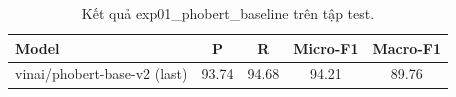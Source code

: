 \begin{table}[t]
\centering
\begin{tabular}{lcccc}
\hline
\textbf{Model} & \textbf{P} & \textbf{R} & \textbf{Micro-F1} & \textbf{Macro-F1} \\
\hline
vinai/phobert-base-v2 (last) & 93.74 & 94.68 & 94.21 & 89.76 \\
\hline
\end{tabular}
\caption{Kết quả exp01_phobert_baseline trên tập test.}
\label{tab:main}
\end{table}